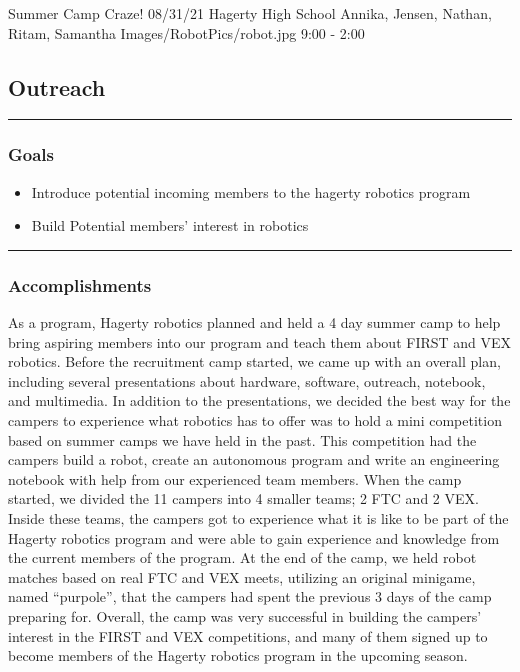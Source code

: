 \insertmeeting 
	{Summer Camp Craze!} 
	{08/31/21}
	{Hagerty High School}
	{Annika, Jensen, Nathan, Ritam, Samantha}
	{Images/RobotPics/robot.jpg}
	{9:00 - 2:00}
	
\subsection*{Outreach}
\noindent\hfil\rule{\textwidth}{.4pt}\hfil
\subsubsection*{Goals}
\begin{itemize}
    \item Introduce potential incoming members to the hagerty robotics program
    \item Build Potential members' interest in robotics

\end{itemize} 

\noindent\hfil\rule{\textwidth}{.4pt}\hfil

\subsubsection*{Accomplishments}
As a program, Hagerty robotics planned and held a 4 day summer camp to help bring aspiring members into our program and teach them about FIRST and VEX robotics. Before the recruitment camp started, we came up with an overall plan, including several presentations about hardware, software, outreach, notebook, and multimedia. In addition to the presentations, we decided the best way for the campers to experience what robotics has to offer was to hold a mini competition based on summer camps we have held in the past. This competition had the campers build a robot, create an autonomous program and write an engineering notebook with help from our experienced team members. When the camp started, we divided the 11 campers into 4 smaller teams; 2 FTC and 2 VEX. Inside these teams, the campers got to experience what it is like to be part of the Hagerty robotics program and were able to gain experience and knowledge from the current members of the program. At the end of the camp, we held robot matches based on real FTC and VEX meets, utilizing an original minigame, named “purpole”, that the campers had spent the previous 3 days of the camp preparing for. Overall, the camp was very successful in building the campers’ interest in the FIRST and VEX competitions, and many of them signed up to become members of the Hagerty robotics program in the upcoming season.